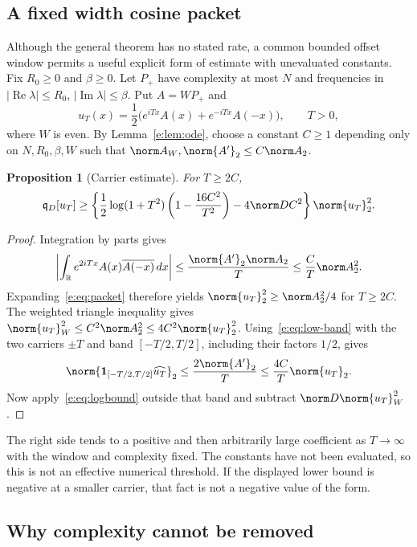 \documentclass[11pt,a4paper]{article}
\numberwithin{equation}{section}
\newtheorem{proposition}[theorem]{Proposition}
\theoremstyle{definition}\newtheorem{definition}[theorem]{Definition}
\theoremstyle{remark}\newtheorem{remark}[theorem]{Remark}
\newcommand{\R}{\mathbb R}\newcommand{\C}{\mathbb C}\newcommand{\N}{\mathbb N}
\newcommand{\qD}{\mathfrak q_D}\newcommand{\qth}{\mathfrak q_\theta}
\DeclareMathOperator{\Rea}{Re}\DeclareMathOperator{\Ima}{Im}
\begin{document}
\subsection{A fixed width cosine packet}\label{e:sec:packet}

Although the general theorem has no stated rate, a common bounded offset
window permits a useful explicit form of estimate with unevaluated
constants. Fix $R_0\ge0$ and $\beta\ge0$. Let $P_+$ have complexity at most $N$ and frequencies in
$|\Rea\lambda|\le R_0$, $|\Ima\lambda|\le\beta$. Put $A=WP_+$ and
\begin{equation}\label{e:eq:packet}
 u_T(x)=\frac12\bigl(e^{iTx}A(x)+e^{-iTx}A(-x)\bigr),\qquad T>0,
\end{equation}
where $W$ is even. By Lemma~\ref{e:lem:ode}, choose a constant $C\ge1$
depending only on $N,R_0,\beta,W$ such that
$\norm A_W,\norm{A'}_2\le C\norm A_2$.

\begin{proposition}[Carrier estimate]\label{e:prop:packet}
For $T\ge2C$,
\begin{equation}\label{e:eq:packet-bound}
 \qD[u_T]\ge\left\{
 \frac12\log(1+T^2)\left(1-\frac{16C^2}{T^2}\right)
 -4\norm D C^2\right\}\norm{u_T}_2^2.
\end{equation}
\end{proposition}
\begin{proof}
Integration by parts gives
\[
 \left|\int_\R e^{2iTx}A(x)\overline{A(-x)}\,dx\right|
 \le\frac{\norm{A'}_2\norm A_2}{T}
 \le\frac C T\norm A_2^2.
\]
Expanding~\eqref{e:eq:packet} therefore yields
$\norm{u_T}_2^2\ge\norm A_2^2/4$ for $T\ge2C$.
The weighted triangle inequality gives
$\norm{u_T}_W^2\le C^2\norm A_2^2\le4C^2\norm{u_T}_2^2$.
Using~\eqref{e:eq:low-band} with the two carriers $\pm T$ and band
$[-T/2,T/2]$, including their factors $1/2$, gives
\[
 \norm{\mathbf1_{[-T/2,T/2]}\widehat{u_T}}_2
 \le\frac{2\norm{A'}_2}{T}
 \le\frac{4C}{T}\norm{u_T}_2.
\]
Now apply~\eqref{e:eq:logbound} outside that band and subtract
$\norm D\norm{u_T}_W^2$.
\end{proof}

The right side tends to a positive and then arbitrarily large coefficient
as $T\to\infty$ with the window and complexity fixed. The constants have
not been evaluated, so this is not an effective numerical threshold.
If the displayed lower bound is negative at a smaller carrier, that fact
is not a negative value of the form.

\subsection{Why complexity cannot be removed}\label{e:sec:limits}
\end{document}
